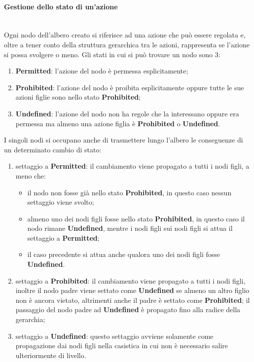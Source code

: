 \documentclass[12pt,a4paper,twoside]{book}
\begin{document}
\paragraph{Gestione dello stato di un'azione}\mbox{}\\
\label{ruleTree}
Ogni nodo dell'albero creato si riferisce ad una azione che può essere regolata e, oltre a tener conto della struttura gerarchica tra le azioni, rappresenta se l'azione si possa svolgere o meno. Gli stati in cui si può trovare un nodo sono 3:
\begin{enumerate}
\item \textbf{Permitted}: l'azione del nodo è permessa esplicitamente;
\item \textbf{Prohibited}: l'azione del nodo è proibita esplicitamente oppure tutte le sue azioni figlie sono nello stato \textbf{Prohibited};
\item \textbf{Undefined}: l'azione del nodo non ha regole che la interessano oppure era permessa ma almeno una azione figlia è \textbf{Prohibited} o \textbf{Undefined}.
\end{enumerate}
I singoli nodi si occupano anche di trasmettere lungo l'albero le conseguenze di un determinato cambio di stato:
\begin{enumerate}
\item settaggio a \textbf{Permitted}: il cambiamento viene propagato a tutti i nodi figli, a meno che:
\begin{itemize}
\item il nodo non fosse già nello stato \textbf{Prohibited}, in questo caso nessun settaggio viene svolto;
\item almeno uno dei nodi figli fosse nello stato \textbf{Prohibited}, in questo caso il nodo rimane  \textbf{Undefined}, mentre i nodi figli sui nodi figli si attua il settaggio a \textbf{Permitted};
\item il caso precedente si attua anche qualora uno dei nodi figli fosse \textbf{Undefined}.
\end{itemize}
\item settaggio a \textbf{Prohibited}: il cambiamento viene propagato a tutti i nodi figli, inoltre il nodo padre viene settato come \textbf{Undefined} se almeno un altro figlio non è ancora vietato, altrimenti anche il padre è settato come \textbf{Prohibited}; il passaggio del nodo padre ad \textbf{Undefined} è propagato fino alla radice della gerarchia;
\item settaggio a \textbf{Undefined}: questo settaggio avviene solamente come propagazione dai nodi figli nella casistica in cui non è necessario salire ulteriormente di livello.
\end{enumerate}
\end{document}

